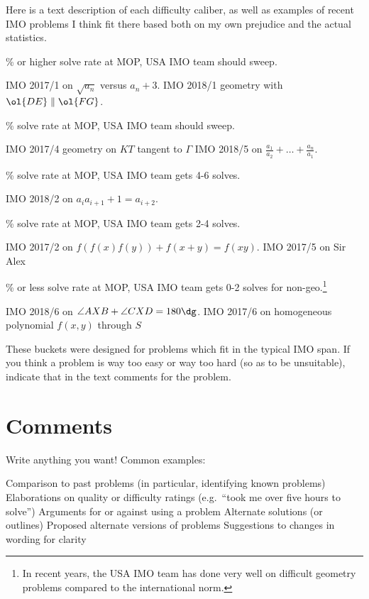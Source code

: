 Here is a text description of each difficulty caliber,
as well as examples of recent IMO problems I think fit there
based both on my own prejudice and the actual statistics.
\begin{description}
  \% or higher solve rate at MOP,
  USA IMO team should sweep.
  \begin{itemize}
    \ii IMO 2017/1 on $\sqrt{a_n}$ versus $a_n+3$.
    \ii IMO 2018/1 geometry with $\ol{DE} \parallel \ol{FG}$.
  \end{itemize}
  \% solve rate at MOP,
  USA IMO team should sweep.
  \begin{itemize}
    \ii IMO 2017/4 geometry on $KT$ tangent to $\Gamma$
    \ii IMO 2018/5 on $\frac{a_1}{a_2} + \dots + \frac{a_n}{a_1}$.
  \end{itemize}
  \% solve rate at MOP,
  USA IMO team gets 4-6 solves.
  \begin{itemize}
    \ii IMO 2018/2 on $a_i a_{i+1} + 1 = a_{i+2}$.
  \end{itemize}
  \% solve rate at MOP,
  USA IMO team gets 2-4 solves.
  \begin{itemize}
    \ii IMO 2017/2 on $f(f(x)f(y))+f(x+y) = f(xy)$.
    \ii IMO 2017/5 on Sir Alex
  \end{itemize}
  \% or less solve rate at MOP,
  USA IMO team gets 0-2 solves for non-geo.\footnote{In
    recent years, the USA IMO team has
    done very well on difficult geometry problems
    compared to the international norm.}
  \begin{itemize}
    \ii IMO 2018/6 on $\angle AXB + \angle CXD = 180\dg$.
    \ii IMO 2017/6 on homogeneous polynomial $f(x,y)$ through $S$
  \end{itemize}
\end{description}
These buckets were designed for problems
which fit in the typical IMO span.
If you think a problem is way too easy or way too hard
(so as to be unsuitable),
indicate that in the text comments for the problem.

\section{Comments}
Write anything you want! Common examples:
\begin{itemize}
  \ii Comparison to past problems
  (in particular, identifying known problems)
  \ii Elaborations on quality or difficulty ratings
  (e.g.\ ``took me over five hours to solve'')
  \ii Arguments for or against using a problem
  \ii Alternate solutions (or outlines)
  \ii Proposed alternate versions of problems
  \ii Suggestions to changes in wording for clarity
\end{itemize}


